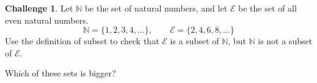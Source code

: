 \documentclass[12pt,letterpaper]{article}
\theoremstyle{definition}
\newtheorem*{challenge}{Challenge}
\begin{document}
\begin{challenge}
Let $\mathbb{N}$ be the set of natural numbers, and let $\mathcal{E}$ be the set of all even natural numbers.
\[
\mathbb{N} = \{1, 2, 3, 4, \ldots \}, \qquad \mathcal{E} = \{2, 4, 6, 8, \ldots \}
\]
Use the definition of subset to check that $\mathcal{E}$ is a subset of $\mathbb{N}$, but $\mathbb{N}$ is not a subset of $\mathcal{E}$. 

Which of these sets is bigger? 
\end{challenge}


\end{document}

